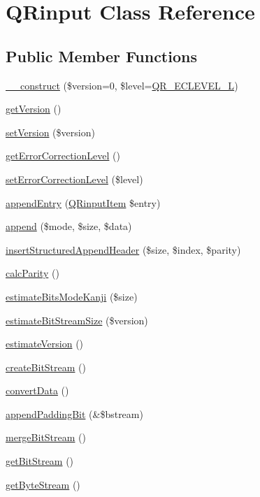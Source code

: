 \hypertarget{class_q_rinput}{\section{Q\-Rinput Class Reference}
\label{class_q_rinput}
}
\subsection*{Public Member Functions}
\begin{DoxyCompactItemize}
\item 
\hyperlink{class_q_rinput_a2351f3e3ad5a02db547f8ee889c3decd}{\-\_\-\-\_\-construct} (\$version=0, \$level=\hyperlink{qrconst_8php_ae106d3baebd9c27c90b2abadb25df012}{Q\-R\-\_\-\-E\-C\-L\-E\-V\-E\-L\-\_\-\-L})
\item 
\hyperlink{class_q_rinput_afa8e7a3a646144eab50188b7a805a389}{get\-Version} ()
\item 
\hyperlink{class_q_rinput_a6a2f870d59df617e76c79a9996646832}{set\-Version} (\$version)
\item 
\hyperlink{class_q_rinput_a6e49359a6d54ec766176ad52095fe8fb}{get\-Error\-Correction\-Level} ()
\item 
\hyperlink{class_q_rinput_a0d2d8094a1d5f38f40d0c7c92a8e4e55}{set\-Error\-Correction\-Level} (\$level)
\item 
\hyperlink{class_q_rinput_aa58f7c083dab2a76d10666e48488f48d}{append\-Entry} (\hyperlink{class_q_rinput_item}{Q\-Rinput\-Item} \$entry)
\item 
\hyperlink{class_q_rinput_a7998c9ddbbe047ddfb49701bcab2f201}{append} (\$mode, \$size, \$data)
\item 
\hyperlink{class_q_rinput_a5135cf4451a31fd114891eda812925c5}{insert\-Structured\-Append\-Header} (\$size, \$index, \$parity)
\item 
\hyperlink{class_q_rinput_a3226eaa1f9eb7678361c4b57e33de7b9}{calc\-Parity} ()
\item 
\hyperlink{class_q_rinput_a2f00f20d82e030bbd7c1dc0edd1993a2}{estimate\-Bits\-Mode\-Kanji} (\$size)
\item 
\hyperlink{class_q_rinput_a4c0d6f07d39ba33e72c4b50a962b2915}{estimate\-Bit\-Stream\-Size} (\$version)
\item 
\hyperlink{class_q_rinput_a5ba363f173fa4d97b248095da0e560b4}{estimate\-Version} ()
\item 
\hyperlink{class_q_rinput_af32e641c34e1043162b5f290cac64c88}{create\-Bit\-Stream} ()
\item 
\hyperlink{class_q_rinput_a5c0ff30b7602ddfb3cca2d111064af4b}{convert\-Data} ()
\item 
\hyperlink{class_q_rinput_a78d33b81045b29e5f7632965a7194b47}{append\-Padding\-Bit} (\&\$bstream)
\item 
\hyperlink{class_q_rinput_abfe700763d59c433cf7e319b9e1d0085}{merge\-Bit\-Stream} ()
\item 
\hyperlink{class_q_rinput_a431c3808327e69458e57e17f371fdb55}{get\-Bit\-Stream} ()
\item 
\hyperlink{class_q_rinput_abcfabd8a5fbceee737a6c7078bf7f6a1}{get\-Byte\-Stream} ()
\end{DoxyCompactItemize}
